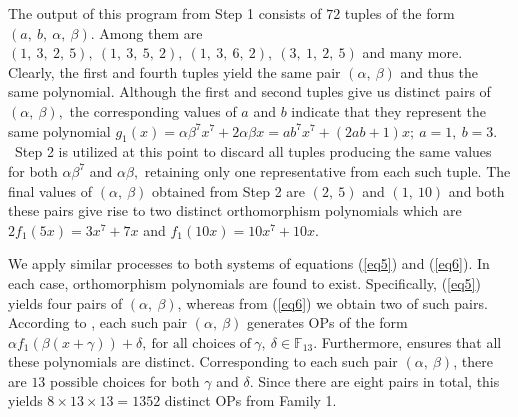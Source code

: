 \documentclass[12pt,a4wide, reqno]{amsart}
\theoremstyle{definition}
\theoremstyle{remark}
\numberwithin{equation}{section}
\begin{document}
The output of this program from Step 1 consists of $72$ tuples of the form $(a,~b,~\alpha,~\beta).$ Among them are $(1,~3,~2,~5),~(1,~3,~5,~2),~(1,~3,~6,~2),~(3,~1,~2,~5)$ and many more. Clearly, the first and fourth tuples yield the same pair $(\alpha,~\beta)$ and thus the same polynomial. Although the first and second tuples give us distinct pairs of $(\alpha,~\beta),$ the corresponding values of $a$ and $b$  indicate that they represent the same polynomial $g_1(x)=\alpha \beta^7x^7+2\alpha \beta x=ab^7x^7+(2ab+1)x;~a=1,~b=3.$ ~Step 2 is utilized at this point to discard all tuples producing the same values for both $\alpha\beta^7$ and $\alpha\beta,$ retaining only one representative from each such tuple. The final values of $(\alpha,~\beta)$ obtained from Step 2 are $(2,~5)$ and $(1,~10)$ and both these pairs give rise to two distinct orthomorphism polynomials which are $2f_1(5x)=3x^7+7x$ and $f_1(10x)=10x^7+10x.$ 

We apply similar processes to both systems of equations (\ref{eq5}) and (\ref{eq6}). In each case, orthomorphism polynomials are found to exist. Specifically, (\ref{eq5}) yields four pairs of $(\alpha,~\beta)$, whereas from (\ref{eq6}) we obtain two of such pairs. According to , each such pair $(\alpha,~\beta)$ generates OPs of the form $\alpha f_1(\beta(x+\gamma))+\delta,~\text{for all choices of}~\gamma,~\delta \in \mathbb{F}_{13}.$ Furthermore,  ensures that all these polynomials are distinct. Corresponding to each such pair $(\alpha,~\beta)$, there are $13$ possible choices for both $\gamma$ and $\delta.$ Since there are eight pairs in total, this yields $8\times 13\times 13=1352$ distinct OPs from Family 1. 
\end{document}
